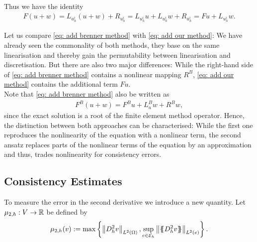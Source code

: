 Thus we have the identity 
\begin{align}
	F(u+w) = L_{u^i_h} (u+w) + R_{u^i_h} = L_{u^i_h} u +L_{u^i_h}w + R_{u^i_h} = Fu + L_{u^i_h}w. \label{eq: add our method}
\end{align}

Let us compare \eqref{eq: add brenner method} with \eqref{eq: add our method}: We have already seen the commonality of both methods, they base on the same linearisation and thereby gain the permutability between linearisation and discretisation. 
But there are also two major differences: While the right-hand side of \eqref{eq: add brenner method} contains a nonlinear mapping $R^B$, \eqref{eq: add our method} contains the additional term $Fu$. \\
Note that \eqref{eq: add brenner method} also be written as 
 \begin{align*}
 F^B(u +w ) = F^B u + L^B_u w + R^Bw,
 \end{align*}
since the exact \MA solution is a root of the finite element method operator. 
Hence, the distinction between both approaches can be characterised: While the first one reproduces the nonlinearity of the \MA equation with a nonlinear term, the second ansatz replaces parts of the nonlinear terms of the equation by an approximation and thus, trades nonlinearity for consistency errors.

\subsection{Consistency Estimates}

To measure the error in the second derivative we introduce a new quantity. Let $\mu_{2,h}:V \rightarrow \mathbb{R}$ be defined by
\[
	\mu_{2,h}(v) := \operatorname{max} \left\{  \left\lVert D_h^2 v \right\rVert_{L^2(\Omega)},  \sup_{e \in \mathcal{E}_h} \left\lVert \{\!\!\{ D_h^2 v \}\!\!\} \right\rVert_{L^2(e)} \right\} .
\]	

